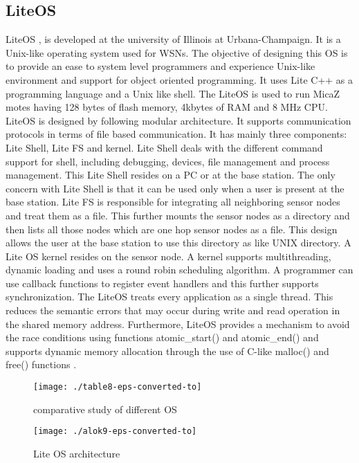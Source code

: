 \documentclass[12pt,journal,communications surveys and tutorials]{IEEEtran}
\begin{document}
\subsection{LiteOS}
LiteOS \cite{cao2008liteos}, is developed at the university of Illinois at Urbana-Champaign. It is a Unix-like operating system used for WSNs. The objective of designing this OS is to provide an ease to system level programmers and experience Unix-like environment and support for object oriented programming. It uses Lite C++ as a programming language and a Unix like shell. The LiteOS is used to run MicaZ motes having 128 bytes of flash memory, 4kbytes of RAM and 8 MHz CPU. LiteOS is designed by following modular architecture. It supports communication protocols in terms of file based communication. It has mainly three components: Lite Shell, Lite FS and kernel. Lite Shell deals with the different command support for shell, including debugging, devices, file management and process management. This Lite Shell resides on a PC or at the base station. The only concern with Lite Shell is that it can be used only when a user is present at the base station. Lite FS is responsible for integrating all neighboring sensor nodes and treat them as a file. This further mounts the sensor nodes as a directory and then lists all those nodes which are one hop sensor nodes as a file. This design allows the user at the base station to use this directory as like UNIX directory. A Lite OS kernel resides on the sensor node. A kernel supports multithreading, dynamic loading and uses a round robin scheduling algorithm. A programmer can use callback functions to register event handlers and this further supports synchronization. The LiteOS treats every application as a single thread. This reduces the semantic errors that may occur during write and read operation in the shared memory address. Furthermore, LiteOS provides a mechanism to avoid the race conditions using functions atomic\_start() and atomic\_end() and supports dynamic memory allocation through the use of C-like malloc() and free() functions \cite{farooq2011operating}.
\begin{figure*}[t]
\centering
\texttt{[image: ./table8-eps-converted-to]}
\caption {comparative study of different OS}

\label{fig:table8-eps-converted-to}
\end{figure*}
\begin{figure}[h]
\centering
\texttt{[image: ./alok9-eps-converted-to]}
\caption{Lite OS architecture}
\label{fig:alok10-eps-converted-to}
\end{figure}
\end{document}
